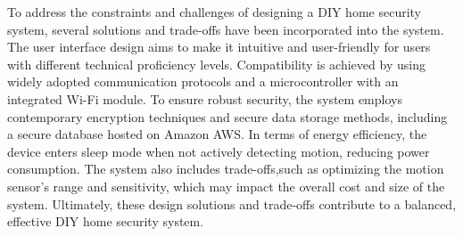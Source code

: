 To address the constraints and challenges of designing a DIY home security system,
several solutions and trade-offs have been incorporated into the system. %
The user interface design aims to make it intuitive and user-friendly for users with different
technical proficiency levels. %
Compatibility is achieved by using widely adopted communication protocols and a microcontroller with an integrated Wi-Fi module. %
To ensure robust security, the system employs contemporary encryption techniques
and secure data storage methods, including a secure database hosted on Amazon AWS\@. %
In terms of energy efficiency, the device enters sleep mode when not actively
detecting motion, reducing power consumption. %
The system also includes trade-offs,such as optimizing the motion sensor's range and sensitivity, which may impact the
overall cost and size of the system. %
Ultimately, these design solutions and trade-offs contribute to a balanced, effective DIY home security system. %